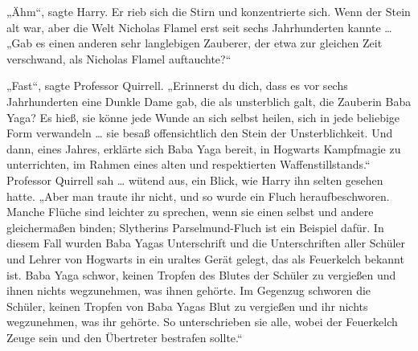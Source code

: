„Ähm“, sagte Harry.
Er rieb sich die Stirn und konzentrierte sich.
Wenn der Stein alt war, aber die Welt Nicholas Flamel erst seit sechs Jahrhunderten kannte …
„Gab es einen anderen sehr langlebigen Zauberer, der etwa zur gleichen Zeit verschwand, als Nicholas Flamel auftauchte?“

„Fast“, sagte Professor Quirrell.
„Erinnerst du dich, dass es vor sechs Jahrhunderten eine Dunkle Dame gab, die als unsterblich galt, die Zauberin Baba Yaga? Es hieß, sie könne jede Wunde an sich selbst heilen, sich in jede beliebige Form verwandeln … sie besaß offensichtlich den Stein der Unsterblichkeit. Und dann, eines Jahres, erklärte sich Baba Yaga bereit, in Hogwarts Kampfmagie zu unterrichten, im Rahmen eines alten und respektierten Waffenstillstands.“
Professor Quirrell sah … wütend aus, ein Blick, wie Harry ihn selten gesehen hatte.
„Aber man traute ihr nicht, und so wurde ein Fluch heraufbeschworen. Manche Flüche sind leichter zu sprechen, wenn sie einen selbst und andere gleichermaßen binden; Slytherins Parselmund-Fluch ist ein Beispiel dafür. In diesem Fall wurden Baba Yagas Unterschrift und die Unterschriften aller Schüler und Lehrer von Hogwarts in ein uraltes Gerät gelegt, das als Feuerkelch bekannt ist. Baba Yaga schwor, keinen Tropfen des Blutes der Schüler zu vergießen und ihnen nichts wegzunehmen, was ihnen gehörte. Im Gegenzug schworen die Schüler, keinen Tropfen von Baba Yagas Blut zu vergießen und ihr nichts wegzunehmen, was ihr gehörte. So unterschrieben sie alle, wobei der Feuerkelch Zeuge sein und den Übertreter bestrafen sollte.“

